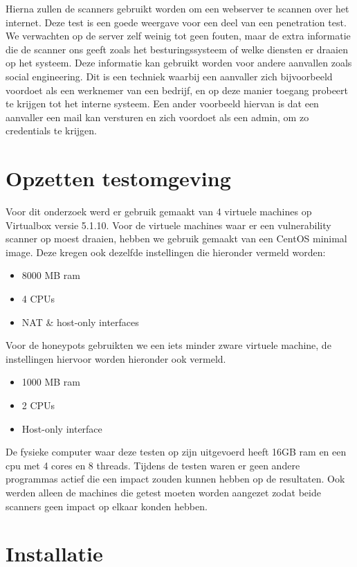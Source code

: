 Hierna zullen de scanners gebruikt worden om een webserver te scannen over het internet. Deze test is een goede weergave voor een deel van een penetration test. We verwachten op de server zelf weinig tot geen fouten, maar de extra informatie die de scanner ons geeft zoals het besturingssysteem of welke diensten er draaien op het systeem. Deze informatie kan gebruikt worden voor andere aanvallen zoals social engineering. Dit is een techniek waarbij een aanvaller zich bijvoorbeeld voordoet als een werknemer van een bedrijf, en op deze manier toegang probeert te krijgen tot het interne systeem. Een ander voorbeeld hiervan is dat een aanvaller een mail kan versturen en zich voordoet als een admin, om zo credentials te krijgen.

\section{Opzetten testomgeving}

Voor dit onderzoek werd er gebruik gemaakt van 4 virtuele machines op Virtualbox versie 5.1.10. Voor de virtuele machines waar er een vulnerability scanner op moest draaien, hebben we gebruik gemaakt van een CentOS minimal image. Deze kregen ook dezelfde instellingen die hieronder vermeld worden:

\begin{itemize}
\item 8000 MB ram
\item 4 CPUs
\item NAT \& host-only interfaces
\end{itemize}

Voor de honeypots gebruikten we een iets minder zware virtuele machine, de instellingen hiervoor worden hieronder ook vermeld. 

\begin{itemize}
\item 1000 MB ram
\item 2 CPUs
\item Host-only interface
\end{itemize}

De fysieke computer waar deze testen op zijn uitgevoerd heeft 16GB ram en een cpu met 4 cores en 8 threads. Tijdens de testen waren er geen andere programmas actief die een impact zouden kunnen hebben op de resultaten. Ook werden alleen de machines die getest moeten worden aangezet zodat beide scanners geen impact op elkaar konden hebben.

\section{Installatie}

